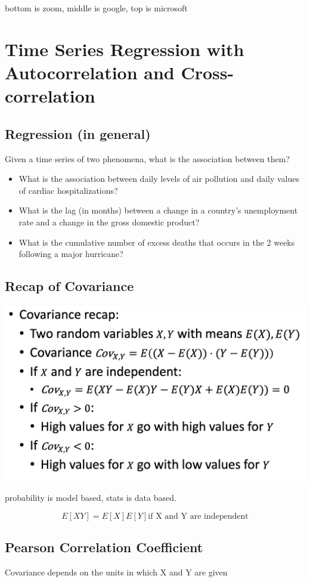 \documentclass[11pt]{article}
\theoremstyle{definition}
\begin{document}
bottom is zoom, middle is google, top is microsoft

\section{Time Series Regression with
Autocorrelation and
Cross-correlation}
\subsection{Regression (in general)}
Given a time series of two phenomena, what is the association
between them?

\begin{itemize}
  \item What is the association between daily levels of air pollution and daily
  values of cardiac hospitalizations?
  \item What is the lag (in months) between a change in a country’s
  unemployment rate and a change in the gross domestic product?
  \item What is the cumulative number of excess deaths that occurs in the 2
  weeks following a major hurricane?
\end{itemize}

\subsection{Recap of Covariance}
\includegraphics[width=\textwidth/2]{5.png}

probability is model based, stats is data based.

\begin{equation}
  E[XY] = E[X]E[Y] \text{if X and Y are independent}
\end{equation}

\subsection{Pearson Correlation Coefficient}
Covariance depends on the units in which X and Y are given
\end{document}
